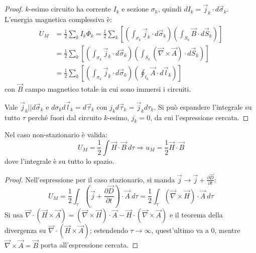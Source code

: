 \documentclass[10pt, a4paper]{scrartcl}
\numberwithin{equation}{subsection}
\theoremstyle{style1}
\newenvironment{boxenv}[1][]{
    \begin{eqbox}[#1]
    }{
   \end{eqbox}
}
\begin{document}
\begin{boxenv}[]
\begin{proof}
	$k$-esimo circuito ha corrente $I_k$ e sezione $\sigma _k$, quindi $dI_k = \vec{j}_k\cdot d\vec{\sigma }_k$. L'energia magnetica complessiva \`e:
	\[
		\begin{split}
			U_M &= \frac{1}{2}\sum_{k}^{} I_k\Phi_k = \frac{1}{2}\sum_{k}^{} \left[ \left(\int_{\sigma _k} \vec{j}_k\cdot d\vec{\sigma }_k\right)  \left(\int_{S_k} \vec{B}\cdot d\vec{S}_k\right)  \right] \\
			    &= \frac{1}{2}\sum_{k}^{} \left[ \left(\int_{\sigma _k} \vec{j}_k\cdot d\vec{\sigma }_k\right)  \left(\int_{S_k} (\vec{\nabla }\times \vec{A})\cdot d\vec{S}_k\right)  \right] \\
			    &= \frac{1}{2}\sum_{k}^{} \left[ \left(\int_{\sigma _k} \vec{j}_k\cdot d\vec{\sigma }_k\right)  \left(\oint_{l_k} \vec{A} \cdot d\vec{l}_k\right)  \right] 
		\end{split}
	\] 
	con $\vec{B}$ campo magnetico totale in cui sono immersi i circuiti. 

	Vale $\vec{j}_k | | d\vec{\sigma }_k$ e $d\sigma_k d\vec{l}_k = d\vec{\tau }_k$ con $j_kd\vec{\tau }_k = \vec{j}_k d\tau _k$. Si pu\`o espandere l'integrale su tutto $\tau $ perch\'e fuori dal circuito $k$-esimo, $j_k=0$, da cui l'espressione cercata.
\end{proof}
\end{boxenv}
\noindent Nel caso non-stazionario \`e valida:
\begin{equation}
	U_M = \frac{1}{2}\int \vec{H}\cdot \vec{B}\ d\tau \Rightarrow u_M = \frac{1}{2} \vec{H}\cdot \vec{B}
\end{equation}
dove l'integrale \`e su tutto lo spazio.
\begin{boxenv}[]
\begin{proof}
	Nell'espressione per il caso stazionario, si manda $\vec{j}\to \vec{j} + \frac{\partial \vec{D}}{\partial t} $:
	\[
	U_M = \frac{1}{2}\int_{\tau } \left(\vec{j}+\frac{\partial \vec{D}}{\partial t} \right) \cdot \vec{A}\ d\tau = \frac{1}{2}\int_{\tau } (\vec{\nabla }\times \vec{H}) \cdot \vec{A}\ d\tau 
	\] 
	Si usa $\vec{\nabla }\cdot (\vec{H}\times \vec{A}) = (\vec{\nabla }\times \vec{H}) \cdot \vec{A} - \vec{H}\cdot (\vec{\nabla }\times \vec{A})$ e il teorema della divergenza su $\vec{\nabla }\cdot (\vec{H}\times \vec{A})$; estendendo $\tau \to \infty$, quest'ultimo va a $0$, mentre $\vec{\nabla }\times \vec{A}=\vec{B}$ porta all'espressione cercata.
\end{proof}
\end{boxenv}
\end{document}

